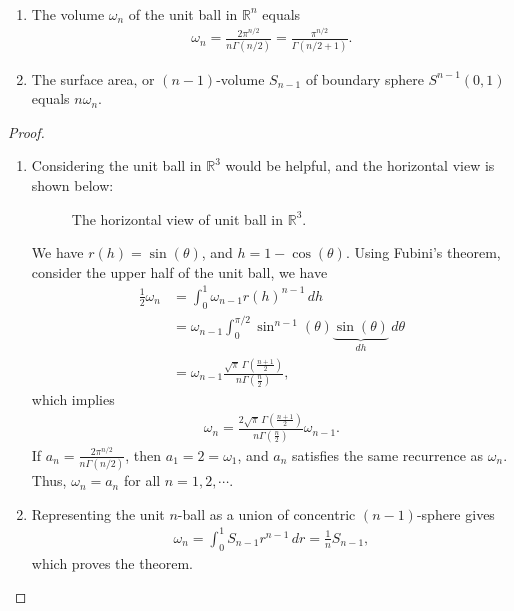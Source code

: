\begin{theorem}
~\begin{enumerate}[label=(\alph*)]
    \item The volume $\omega_n$ of the unit ball in $\mathbb{R}^n$ equals
    \begin{align*}
        \omega_n = \frac{2\pi^{n/2}}{n \Gamma(n/2)} = \frac{\pi^{n/2}}{\Gamma(n/2 + 1)}.
    \end{align*}
    
    \item The surface area, or $(n-1)$-volume $S_{n-1}$ of boundary sphere $S^{n-1}(0,1)$ equals $n \omega_n$.
\end{enumerate}
\end{theorem}
\begin{proof}
~\begin{enumerate}[label=(\alph*)]
    \item Considering the unit ball in $\mathbb{R}^3$ would be helpful, and the horizontal view is shown below:
    \begin{figure}[H]
        \centering
        \caption{The horizontal view of unit ball in $\mathbb{R}^3$.}
        \label{fig:unit_ball}
    \end{figure}
    We have $r(h) = \sin(\theta)$, and $h = 1 - \cos(\theta)$. Using Fubini's theorem, consider the upper half of the unit ball, we have
    \begin{align*}
        \frac{1}{2}\omega_n & = \int^1_0 \omega_{n-1} r(h)^{n-1} \, dh \\
        & = \omega_{n-1} \int^{\pi/2}_0 \sin^{n-1}(\theta) \underbrace{\sin(\theta)}_{dh}\, d\theta \\
        & = \omega_{n-1} \frac{\sqrt{\pi} \, \Gamma\left(\frac{n+1}{2}\right)}{n \Gamma\left(\frac{n}{2}\right)},
    \end{align*}
    which implies
    \begin{align*}
        \omega_n = \frac{2 \sqrt{\pi}\, \Gamma\left(\frac{n+1}{2}\right)}{n \Gamma\left(\frac{n}{2}\right)} \omega_{n-1}.
    \end{align*}
    If $\displaystyle a_n = \frac{2\pi^{n/2}}{n \Gamma(n/2)}$, then $a_1 = 2 = \omega_1$, and $a_n$ satisfies the same recurrence as $\omega_n$. Thus, $\omega_n = a_n$ for all $n = 1,2,\cdots$.
    
    \item Representing the unit $n$-ball as a union of concentric $(n - 1)$-sphere gives
    \begin{align*}
        \omega_n = \int^1_0 S_{n-1} r^{n-1} \, dr = \frac{1}{n} S_{n-1},
    \end{align*}
    which proves the theorem.
\end{enumerate}
\end{proof}